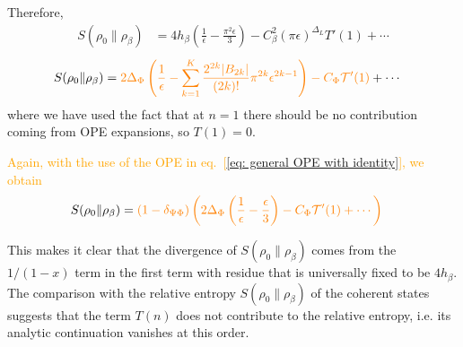 \documentclass[11pt]{article}
\newcommand{\ep}{\epsilon}
\newcommand{\lb}{\left(}
\newcommand{\rb}{\right)}
\newcommand{\JM}[1]{\textcolor{orange}{#1}}
\begin{document}
Therefore,
\begin{align}
  S(\rho_0\|\rho_\beta)&=4h_\beta\lb\frac{1}{\ep}-\frac{\pi^2\ep}{3}\rb - C_\beta^2 (\pi \ep)^{\Delta_L} T'(1)+\cdots
\end{align}
\begin{align*}
  S(\rho_0\|\rho_\beta)&=\JM{2\Delta_{\Phi}\lb\frac{1}{\ep}
  - \sum_{k=1}^{K} \frac{2^{2k}|B_{2k}|} {(2k)!}\pi^{2k}\ep^{2k-1}
  \rb - C_\Phi  \mathcal{T}'(1)}+\cdots
\end{align*}
where we have used the fact that at $n=1$ there should be no contribution coming from OPE expansions, so $T(1)=0$.

\JM{Again, with the use of the OPE in eq.~[\ref{eq: general OPE with identity}], we obtain}
\begin{align}
 S(\rho_0\|\rho_\beta)&=\JM{(1-\delta_{\Psi \Phi})\lb 2\Delta_{\Phi}\lb\frac{1}{\ep}
  - \frac{\ep}{3}
  \rb - C_\Phi  \mathcal{T}'(1)+\cdots\rb}
\end{align}

This makes it clear that the divergence of $S(\rho_0\|\rho_\beta)$ comes from the $1/(1-x)$ term in the first term with residue that is universally fixed to be $4h_\beta$. The comparison with the relative entropy $S(\rho_0\|\rho_\beta)$ of the coherent states suggests that the term $T(n)$ does not contribute to the relative entropy, i.e. its analytic continuation vanishes at this order.
\end{document}
